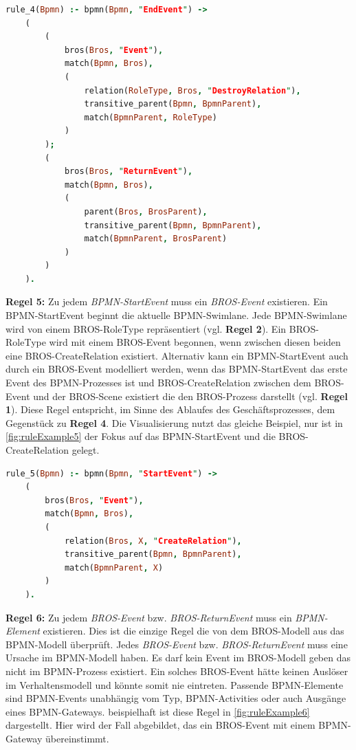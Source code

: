 \begin{lstlisting}[language=Prolog, caption=Formalisierung der Regel 4, label=lst:rule_4]
rule_4(Bpmn) :- bpmn(Bpmn, "EndEvent") ->
    (
        (
            bros(Bros, "Event"),
            match(Bpmn, Bros),
            (
                relation(RoleType, Bros, "DestroyRelation"),
                transitive_parent(Bpmn, BpmnParent),
                match(BpmnParent, RoleType)
            )
        );
        (
            bros(Bros, "ReturnEvent"), 
            match(Bpmn, Bros),
            (
                parent(Bros, BrosParent),
                transitive_parent(Bpmn, BpmnParent),
                match(BpmnParent, BrosParent)
            )
        )
    ).
\end{lstlisting}

\textbf{Regel 5:}
Zu jedem \emph{BPMN-StartEvent} muss ein \emph{BROS-Event} existieren.
Ein BPMN-StartEvent beginnt die aktuelle BPMN-Swimlane.
Jede BPMN-Swimlane wird von einem BROS-RoleType repräsentiert (vgl. \textbf{Regel 2}).
Ein BROS-RoleType wird mit einem BROS-Event begonnen, wenn  zwischen diesen beiden eine BROS-CreateRelation existiert.
Alternativ kann ein BPMN-StartEvent auch durch ein BROS-Event modelliert werden, wenn das BPMN-StartEvent das erste Event des BPMN-Prozesses ist und BROS-CreateRelation zwischen dem BROS-Event und der BROS-Scene existiert die den BROS-Prozess darstellt (vgl. \textbf{Regel 1}).
Diese Regel entspricht, im Sinne des Ablaufes des Geschäftsprozesses, dem Gegenstück zu \textbf{Regel 4}.
Die Visualisierung nutzt das gleiche Beispiel, nur ist in \cref{fig:ruleExample5} der Fokus auf das BPMN-StartEvent und die BROS-CreateRelation gelegt.

\begin{lstlisting}[language=Prolog, caption=Formalisierung der Regel 5, label=lst:rule_5]
rule_5(Bpmn) :- bpmn(Bpmn, "StartEvent") ->
    (
        bros(Bros, "Event"),
        match(Bpmn, Bros),
        (
            relation(Bros, X, "CreateRelation"),
            transitive_parent(Bpmn, BpmnParent),
            match(BpmnParent, X)
        )
    ).
\end{lstlisting}

\textbf{Regel 6:}
Zu jedem \emph{BROS-Event} bzw. \emph{BROS-ReturnEvent} muss ein \emph{BPMN-Element} existieren.
Dies ist die einzige Regel die von dem BROS-Modell aus das BPMN-Modell überprüft.
Jedes \emph{BROS-Event} bzw. \emph{BROS-ReturnEvent} muss eine Ursache im BPMN-Modell haben.
Es darf kein Event im BROS-Modell geben das nicht im BPMN-Prozess existiert.
Ein solches BROS-Event hätte keinen Auslöser im Verhaltensmodell und könnte somit nie eintreten.
Passende BPMN-Elemente sind BPMN-Events unabhängig vom Typ, BPMN-Activities oder auch Ausgänge eines BPMN-Gateways.
beispielhaft ist diese Regel in \cref{fig:ruleExample6} dargestellt.
Hier wird der Fall abgebildet, das ein BROS-Event mit einem BPMN-Gateway übereinstimmt.

